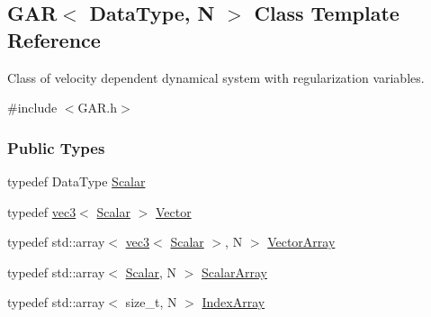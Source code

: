 \hypertarget{class_g_a_r}{}\subsection{G\+AR$<$ Data\+Type, N $>$ Class Template Reference}
\label{class_g_a_r}


Class of velocity dependent dynamical system with regularization variables.  




{\ttfamily \#include $<$G\+A\+R.\+h$>$}

\subsubsection*{Public Types}
\begin{DoxyCompactItemize}
\item 
typedef Data\+Type \mbox{\hyperlink{class_g_a_r_a2ae44eda8e28d5dd26cf707dcda69314}{Scalar}}
\item 
typedef \mbox{\hyperlink{structvec3}{vec3}}$<$ \mbox{\hyperlink{class_g_a_r_a2ae44eda8e28d5dd26cf707dcda69314}{Scalar}} $>$ \mbox{\hyperlink{class_g_a_r_ad2f5b930feb3831a717f96155b3ff74e}{Vector}}
\item 
typedef std\+::array$<$ \mbox{\hyperlink{structvec3}{vec3}}$<$ \mbox{\hyperlink{class_g_a_r_a2ae44eda8e28d5dd26cf707dcda69314}{Scalar}} $>$, N $>$ \mbox{\hyperlink{class_g_a_r_a5818e17eb203504af6e10f38fc38d378}{Vector\+Array}}
\item 
typedef std\+::array$<$ \mbox{\hyperlink{class_g_a_r_a2ae44eda8e28d5dd26cf707dcda69314}{Scalar}}, N $>$ \mbox{\hyperlink{class_g_a_r_a0b446684ae922457a3bf86c904085d8a}{Scalar\+Array}}
\item 
typedef std\+::array$<$ size\+\_\+t, N $>$ \mbox{\hyperlink{class_g_a_r_aaf033049c0cd8f0f86a82b9595086fa5}{Index\+Array}}
\end{DoxyCompactItemize}
